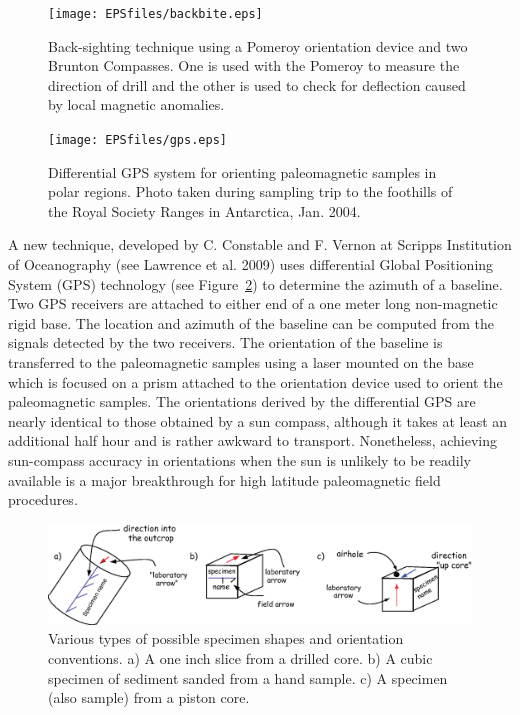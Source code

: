 \begin{figure}[htb]
\centering  \texttt{[image: EPSfiles/backbite.eps]}
\caption{Back-sighting technique using a Pomeroy orientation device and two Brunton Compasses.  One is used with the Pomeroy to measure the direction of drill and the other is used to check for deflection caused by local magnetic anomalies.}
\label{fig:backbite}
\end{figure}
\begin{figure}[h!tb]
\centering  \texttt{[image: EPSfiles/gps.eps]}
\caption{ Differential GPS system for orienting paleomagnetic samples in polar regions.  Photo taken during sampling trip to the foothills of the Royal Society Ranges in Antarctica, Jan. 2004.  
}
\label{fig:gps}
\end{figure}


A new technique, developed by 
C. Constable and F. Vernon at Scripps Institution of Oceanography  (see
Lawrence et al. 2009) \nocite{lawrence08}  uses 
differential Global Positioning System (GPS) technology (see Figure~\ref{fig:gps}) to determine the azimuth of a baseline.  Two GPS receivers are attached to either end of a  one meter long non-magnetic rigid base.  The location and azimuth of the baseline can be computed from the signals detected by the two receivers.  The orientation of the baseline is transferred to the paleomagnetic samples using a laser mounted on the base which is focused on a prism attached to the orientation device used to orient the paleomagnetic samples.   The orientations derived by the differential GPS are nearly identical to those obtained by a sun compass, although it takes at least an additional half hour  and is rather awkward to transport.  Nonetheless, achieving sun-compass accuracy in orientations when the sun is unlikely to be readily available is a major breakthrough for high latitude paleomagnetic field procedures.  



\begin{figure}[htb]
\centering  \includegraphics[width=14 cm]{EPSfiles/samples.eps}
\caption{Various types of possible specimen shapes and orientation conventions.  a) A one inch slice from a drilled core.    b) A cubic specimen of sediment sanded from a hand sample. c) A specimen (also sample) from a piston core.}
\label{fig:samples}
\end{figure}

